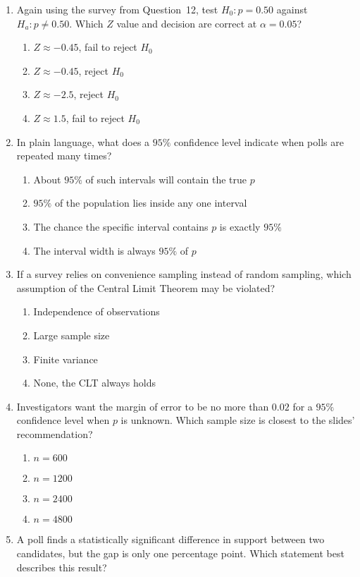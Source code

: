 \documentclass{article}
\begin{document}
\begin{enumerate}
\begin{enumerate}[label=(\Alph*)]
  \end{enumerate}
\item Again using the survey from Question~12, test $H_0:p=0.50$ against $H_a:p\ne0.50$. Which $Z$ value and decision are correct at $\alpha=0.05$?
  \begin{enumerate}[label=(\Alph*)]
  \item $Z\approx-0.45$, fail to reject $H_0$
  \item $Z\approx-0.45$, reject $H_0$
  \item $Z\approx-2.5$, reject $H_0$
  \item $Z\approx1.5$, fail to reject $H_0$
  \end{enumerate}
\item In plain language, what does a $95\%$ confidence level indicate when polls are repeated many times?
  \begin{enumerate}[label=(\Alph*)]
  \item About $95\%$ of such intervals will contain the true $p$
  \item $95\%$ of the population lies inside any one interval
  \item The chance the specific interval contains $p$ is exactly $95\%$
  \item The interval width is always $95\%$ of $p$
  \end{enumerate}
\item If a survey relies on convenience sampling instead of random sampling, which assumption of the Central Limit Theorem may be violated?
  \begin{enumerate}[label=(\Alph*)]
  \item Independence of observations
  \item Large sample size
  \item Finite variance
  \item None, the CLT always holds
  \end{enumerate}
\item Investigators want the margin of error to be no more than $0.02$ for a $95\%$ confidence level when $p$ is unknown. Which sample size is closest to the slides' recommendation?
  \begin{enumerate}[label=(\Alph*)]
  \item $n=600$
  \item $n=1200$
  \item $n=2400$
  \item $n=4800$
  \end{enumerate}
\item A poll finds a statistically significant difference in support between two candidates, but the gap is only one percentage point. Which statement best describes this result?

\end{enumerate}
\end{document}
